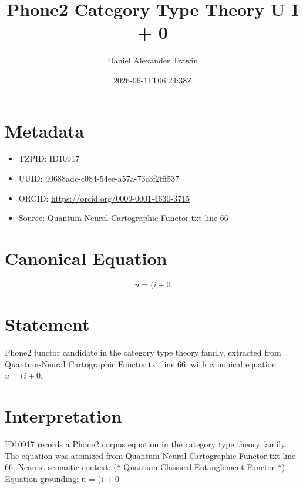 \documentclass[11pt]{article}
\title{Phone2 Category Type Theory U I + 0}
\author{Daniel Alexander Trawin}
\date{2026-06-11T06:24:38Z}
\begin{document}
\maketitle
\section*{Metadata}
\begin{itemize}
\item TZPID: ID10917
\item UUID: 40688adc-c084-54ee-a57a-73c3f2fff537
\item ORCID: \url{https://orcid.org/0009-0001-4630-3715}
\item Source: Quantum-Neural Cartographic Functor.txt line 66
\end{itemize}
\section*{Canonical Equation}
\[
u = (i + 0
\]
\section*{Statement}
Phone2 functor candidate in the category type theory family, extracted from Quantum-Neural Cartographic Functor.txt line 66, with canonical equation $u = (i + 0$.
\section*{Interpretation}
ID10917 records a Phone2 corpus equation in the category type theory family. The equation was atomized from Quantum-Neural Cartographic Functor.txt line 66. Nearest semantic context: (* Quantum-Classical Entanglement Functor *) Equation grounding: u = (i + 0
\end{document}
